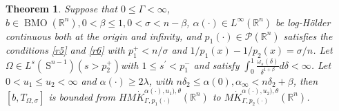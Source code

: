 \documentclass[oneside,reqno]{amsart}
\newtheorem{theorem}{Theorem}[section]
\numberwithin{equation}{section}
\theoremstyle{definition}
\begin{document}
\begin{theorem}

Suppose that  $0 \leq \Gamma<\infty$, $b \in \operatorname{BMO}\left(\mathbb{R}^{n}\right), 0<\beta \leq 1,0<\sigma<n-\beta$,  $\alpha(\cdot) \in L^{\infty}\left(\mathbb{R}^{n}\right)$ be log-H\"older continuous both at the origin and infinity, and $p_{1}(\cdot) \in \mathcal{P}\left(\mathbb{R}^{n}\right)$ satisfies the conditions \eqref{r5} and \eqref{r6} with $p_{1}^{+}<n / \sigma$ and $1 / p_{1}(x)-1 / p_{2}(x)=\sigma / n$.
Let $\Omega \in L^{s}\left(\mathrm{~S}^{n-1}\right)\left(s>p_{2}^{+}\right)$with $1 \leq s^{\prime}<p_{1}^{-}$ and satisfy $\int_{0}^{1} \frac{\omega_{s}(\delta)}{\delta^{1+\beta}} d \delta<\infty$.
Let $0<u_{1} \leq u_{2}<\infty$ and  $\alpha(\cdot)\geq 2\lambda$, with $n \delta_{2} \leq  \alpha(0), \alpha_{\infty}<n \delta_{2} +\beta $, then $\left[b, T_{\Omega, \sigma}\right]$ is bounded from $H M\dot{K} ^{\alpha(\cdot),u_1),\theta}_{ \Gamma, p_1(\cdot)}(\mathbb{R}^n)$ to $ M\dot{K} ^{\alpha(\cdot),u_2),\theta}_{ \Gamma, p_2(\cdot)}(\mathbb{R}^n)$.  
\end{theorem}
\end{document}
